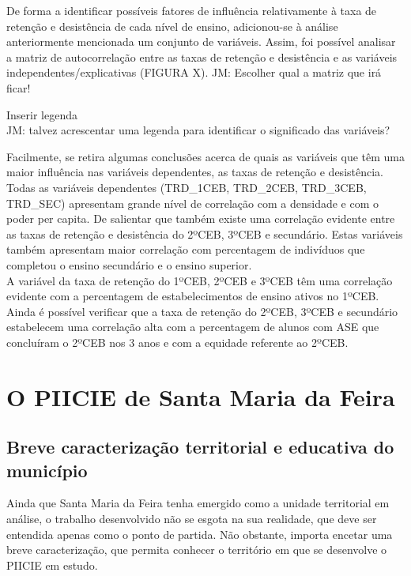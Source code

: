 \documentclass[
]{book}
\begin{document}
De forma a identificar possíveis fatores de influência relativamente à taxa de retenção e desistência de cada nível de ensino, adicionou-se à análise anteriormente mencionada um conjunto de variáveis. Assim, foi possível analisar a matriz de autocorrelação entre as taxas de retenção e desistência e as variáveis independentes/explicativas (FIGURA X).
JM: Escolher qual a matriz que irá ficar!

Inserir legenda\\
JM: talvez acrescentar uma legenda para identificar o significado das variáveis?

Facilmente, se retira algumas conclusões acerca de quais as variáveis que têm uma maior influência nas variáveis dependentes, as taxas de retenção e desistência. Todas as variáveis dependentes (TRD\_1CEB, TRD\_2CEB, TRD\_3CEB, TRD\_SEC) apresentam grande nível de correlação com a densidade e com o poder per capita. De salientar que também existe uma correlação evidente entre as taxas de retenção e desistência do 2ºCEB, 3ºCEB e secundário. Estas variáveis também apresentam maior correlação com percentagem de indivíduos que completou o ensino secundário e o ensino superior.\\
A variável da taxa de retenção do 1ºCEB, 2ºCEB e 3ºCEB têm uma correlação evidente com a percentagem de estabelecimentos de ensino ativos no 1ºCEB. Ainda é possível verificar que a taxa de retenção do 2ºCEB, 3ºCEB e secundário estabelecem uma correlação alta com a percentagem de alunos com ASE que concluíram o 2ºCEB nos 3 anos e com a equidade referente ao 2ºCEB.

\hypertarget{PIICIE}{%
\chapter{O PIICIE de Santa Maria da Feira}\label{PIICIE}}

\hypertarget{breve-caracterizauxe7uxe3o-territorial-e-educativa-do-municuxedpio}{%
\section{Breve caracterização territorial e educativa do município}\label{breve-caracterizauxe7uxe3o-territorial-e-educativa-do-municuxedpio}}

Ainda que Santa Maria da Feira tenha emergido como a unidade territorial em análise, o trabalho desenvolvido não se esgota na sua realidade, que deve ser entendida apenas como o ponto de partida. Não obstante, importa encetar uma breve caracterização, que permita conhecer o território em que se desenvolve o PIICIE em estudo.
\end{document}
